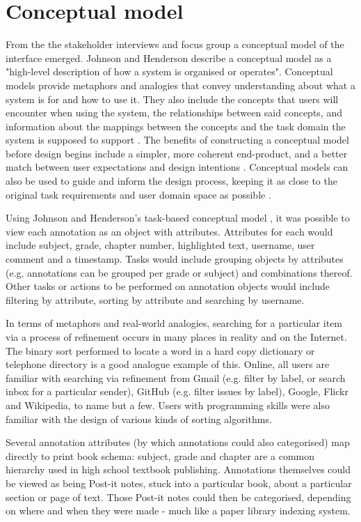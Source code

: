 \section{Conceptual model}
From the the stakeholder interviews and focus group a conceptual model of the interface emerged. Johnson and Henderson \citep[p. 27]{Johnson} describe a conceptual model as a "high-level description of how a system is organised or operates". Conceptual models provide metaphors and analogies that convey understanding about what a system is for and how to use it. They also include the concepts that users will encounter when using the system, the relationships between said concepts, and information about the mappings between the concepts and the task domain the system is supposed to support \citep[p. 40-41]{RogersPreece}.  The benefits of constructing a conceptual model before design begins include a simpler, more coherent end-product, and a better match between user expectations and design intentions \citep[p. 26]{Johnson}. Conceptual models can also be used to guide and inform the design process, keeping it as close to the original task requirements and user domain space as possible \citep[p. 40]{RogersPreece}. 

Using Johnson and Henderson's task-based conceptual model \citep[p. 30]{Johnson}, it was possible to view each annotation as an object with attributes. Attributes for each would include subject, grade, chapter number, highlighted text, username, user comment and a timestamp. Tasks would include grouping objects by attributes (e.g. annotations can be grouped per grade or subject) and combinations thereof. Other tasks or actions to be performed on annotation objects would include filtering by attribute, sorting by attribute and searching by username. 

In terms of metaphors and real-world analogies, searching for a particular item via a process of refinement occurs in many places in reality and on the Internet. The binary sort performed to locate a word in a hard copy dictionary or telephone directory is a good analogue example of this. Online, all users are familiar with searching via refinement from Gmail (e.g. filter by label, or search inbox for a particular sender), GitHub (e.g. filter issues by label), Google, Flickr and Wikipedia, to name but a few. Users with programming skills were also familiar with the design of various kinds of sorting algorithms. 

Several annotation attributes (by which annotations could also categorised) map directly to print book schema: subject, grade and chapter are a common hierarchy used in high school textbook publishing. Annotations themselves could be viewed as being Post-it notes, stuck into a particular book, about a particular section or page of text. Those Post-it notes could then be categorised, depending on where and when they were made - much like a paper library indexing system. 

